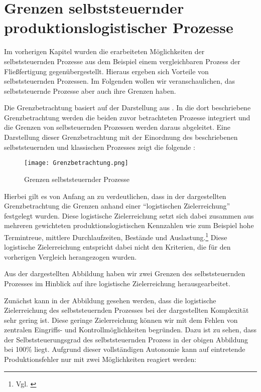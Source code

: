 \section{Grenzen selbststeuernder produktionslogistischer Prozesse}
\label{sec:Grenzen}

Im vorherigen Kapitel wurden die erarbeiteten Möglichkeiten der
selbststeuernden Prozesse aus dem Beispiel einem vergleichbaren Prozess der
Fließfertigung gegenübergestellt. Hieraus ergeben sich Vorteile von
selbststeuernden Prozessen. Im Folgenden wollen wir veranschaulichen,
das selbststeuernde Prozesse aber auch ihre Grenzen haben.

Die Grenzbetrachtung basiert auf der Darstellung aus \citet{evolution2007}.
In die dort beschriebene Grenzbetrachtung werden die beiden zuvor 
betrachteten Prozesse integriert und die Grenzen von selbsteuernden 
Prozessen werden daraus abgeleitet. Eine Darstellung dieser Grenzbetrachtung
mit der Einordnung des beschriebenen selbststeuernden und klassischen Prozesses
zeigt die folgende :
 
\begin{figure}[htb] 
\centering
\texttt{[image: Grenzbetrachtung.png]}
\caption[Grenzbetrachtung]{Grenzen selbststeuernder Prozesse\protect\footnotemark}
\label{fig:Grenzbetrachtung}
\end{figure}

Hierbei gilt es von Anfang an zu verdeutlichen, dass in der dargestellten
Grenzbetrachtung die Grenzen anhand einer "`logistischen Zielerreichung"'
festgelegt wurden. Diese logistische Zielerreichung setzt sich dabei zusammen
aus mehreren gewichteten produktionslogistischen Kennzahlen wie zum Beispiel
hohe Termintreue, mittlere Durchlaufzeiten, Bestände und Auslastung.\footnote{Vgl. \citet[S.~4]{evolution2007}}
Diese logistische Zielerreichung entspricht dabei nicht den Kriterien,
die für den vorherigen Vergleich herangezogen wurden. 

Aus der dargestellten Abbildung haben wir zwei Grenzen des selbststeuernden
Prozesses im Hinblick auf ihre logistische Zielerreichung herausgearbeitet.

Zunächst kann in der Abbildung gesehen werden, dass die logistische Zielerreichung
des selbststeuernden Prozesses bei der dargestellten Komplexität sehr gering ist.
Diese geringe Zielerreichung können wir mit dem Fehlen von zentralen 
Eingriffs- und Kontrollmöglichkeiten begründen. Dazu ist zu sehen, dass der
Selbststeuerungsgrad des selbststeuernden Prozess in der obigen Abbildung bei 100\% liegt. Aufgrund 
dieser vollständigen Autonomie kann auf eintretende Produktionsfehler nur mit zwei
Möglichkeiten reagiert werden:

